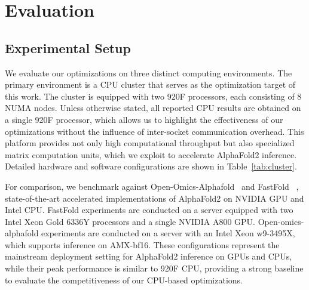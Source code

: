 \section{Evaluation}
\label{sec:evaluation}
\subsection{Experimental Setup}
We evaluate our optimizations on three distinct computing environments. The primary environment is a CPU cluster that serves as the optimization target of this work. The cluster is equipped with two 920F processors, each consisting of 8 NUMA nodes. Unless otherwise stated, all reported CPU results are obtained on a single 920F processor, which allows us to highlight the effectiveness of our optimizations without the influence of inter-socket communication overhead. This platform provides not only high computational throughput but also specialized matrix computation units, which we exploit to accelerate AlphaFold2 inference. Detailed hardware and software configurations are shown in Table~\ref{tab:cluster}.

For comparison, we benchmark against Open-Omics-Alphafold~\cite{openomicsalphafold} and FastFold~\cite{cheng2024fastfold} , state-of-the-art accelerated implementations of AlphaFold2 on NVIDIA GPU and Intel CPU. FastFold experiments are conducted on a server equipped with two Intel Xeon Gold 6336Y processors and a single NVIDIA A800 GPU. Open-omics-alphafold experiments are conducted on a server with an Intel Xeon w9-3495X, which supports inference on AMX-bf16. These configurations represent the mainstream deployment setting for AlphaFold2 inference on GPUs and CPUs, while their peak performance is similar to 920F CPU, providing a strong baseline to evaluate the competitiveness of our CPU-based optimizations.


